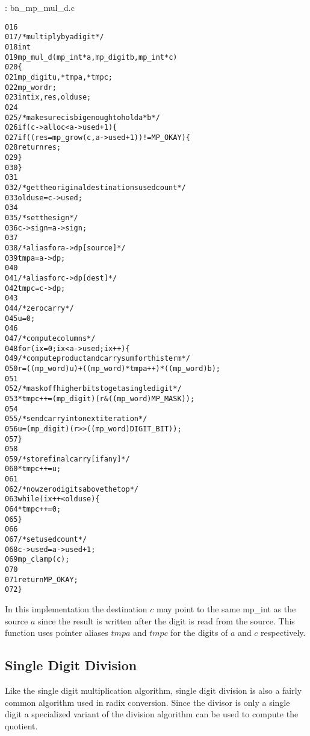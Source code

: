 \documentclass[b5paper]{book}
\begin{document}
\vspace{+3mm}\begin{small}
\hspace{-5.1mm}{\bf File}: bn\_mp\_mul\_d.c
\vspace{-3mm}
\begin{alltt}
016   
017   /* multiply by a digit */
018   int
019   mp_mul_d (mp_int * a, mp_digit b, mp_int * c)
020   \{
021     mp_digit u, *tmpa, *tmpc;
022     mp_word  r;
023     int      ix, res, olduse;
024   
025     /* make sure c is big enough to hold a*b */
026     if (c->alloc < a->used + 1) \{
027       if ((res = mp_grow (c, a->used + 1)) != MP_OKAY) \{
028         return res;
029       \}
030     \}
031   
032     /* get the original destinations used count */
033     olduse = c->used;
034   
035     /* set the sign */
036     c->sign = a->sign;
037   
038     /* alias for a->dp [source] */
039     tmpa = a->dp;
040   
041     /* alias for c->dp [dest] */
042     tmpc = c->dp;
043   
044     /* zero carry */
045     u = 0;
046   
047     /* compute columns */
048     for (ix = 0; ix < a->used; ix++) \{
049       /* compute product and carry sum for this term */
050       r       = ((mp_word) u) + ((mp_word)*tmpa++) * ((mp_word)b);
051   
052       /* mask off higher bits to get a single digit */
053       *tmpc++ = (mp_digit) (r & ((mp_word) MP_MASK));
054   
055       /* send carry into next iteration */
056       u       = (mp_digit) (r >> ((mp_word) DIGIT_BIT));
057     \}
058   
059     /* store final carry [if any] */
060     *tmpc++ = u;
061   
062     /* now zero digits above the top */
063     while (ix++ < olduse) \{
064        *tmpc++ = 0;
065     \}
066   
067     /* set used count */
068     c->used = a->used + 1;
069     mp_clamp(c);
070   
071     return MP_OKAY;
072   \}
\end{alltt}
\end{small}

In this implementation the destination $c$ may point to the same mp\_int as the source $a$ since the result is written after the digit is 
read from the source.  This function uses pointer aliases $tmpa$ and $tmpc$ for the digits of $a$ and $c$ respectively.  

\subsection{Single Digit Division}
Like the single digit multiplication algorithm, single digit division is also a fairly common algorithm used in radix conversion.  Since the
divisor is only a single digit a specialized variant of the division algorithm can be used to compute the quotient.  
\end{document}
